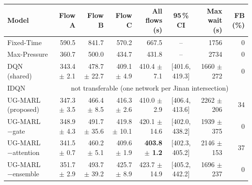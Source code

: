 \begin{tabular}{lrrrrcrr}
\toprule
Model & Flow A & Flow B & Flow C & All flows (s) & 95\,\% CI & Max wait (s) & FB (\%) \\
\midrule
Fixed-Time & 590.5 & 841.7 & 570.2 & 667.5 & -- & 1756 & 0 \\
Max-Pressure & 360.7 & 500.0 & 434.7 & 431.8 & -- & 2734 & 0 \\
\midrule
DQN (shared) & 343.4 $\pm$ 2.1 & 478.7 $\pm$ 22.7 & 409.1 $\pm$ 4.9 & 410.4 $\pm$ 7.1 & [401.6, 419.3] & 1660 $\pm$ 272 & 0 \\
IDQN & \multicolumn{7}{c}{not transferable (one network per Jinan intersection)} \\
\midrule
UG-MARL (proposed) & 347.3 $\pm$ 3.5 & 466.4 $\pm$ 8.5 & 416.3 $\pm$ 2.6 & 410.0 $\pm$ 2.9 & [406.4, 413.6] & 2262 $\pm$ 206 & 34 \\
UG-MARL $-$gate & 348.9 $\pm$ 4.3 & 491.7 $\pm$ 35.6 & 419.8 $\pm$ 10.1 & 420.1 $\pm$ 14.6 & [402.0, 438.2] & 1939 $\pm$ 375 & 0 \\
UG-MARL $-$attention & 341.5 $\pm$ 0.7 & 460.2 $\pm$ 5.1 & 409.6 $\pm$ 1.9 & \textbf{403.8 $\pm$ 1.2} & [402.3, 405.2] & 2146 $\pm$ 153 & 37 \\
UG-MARL $-$ensemble & 351.7 $\pm$ 2.9 & 493.7 $\pm$ 39.2 & 425.7 $\pm$ 8.9 & 423.7 $\pm$ 14.9 & [405.2, 442.2] & 1696 $\pm$ 237 & 0 \\
\bottomrule
\end{tabular}
